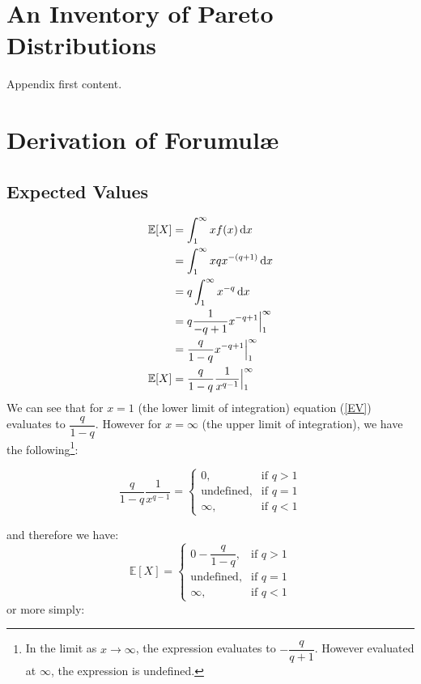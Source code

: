 \newpage
\appendix
\appendixpage

\section{An Inventory of Pareto Distributions}\label{ParetoInventory}
Appendix first content.

\section{Derivation of Forumul\ae}

\subsection{Expected Values}\label{sec:ParetoEV}
\begin{align}
\mathbb{E}[X] & = \int_{1}^{\infty}x f(x) \operatorname{d \!} x \nonumber\\
& = \int_{1}^{\infty}xqx^{-(q+1)} \operatorname{d \!} x\nonumber\\
& = q \int_{1}^{\infty}x^{-q} \operatorname{d \!} x\nonumber\\
& = q \frac{1}{-q+1} x^{-q+1} \Big|_{1}^{\infty}\nonumber\\
& = \frac{q}{1-q} x^{-q+1} \Big|_{1}^{\infty}\nonumber\\
\mathbb{E}[X] 	& = \frac{q}{1-q} \dfrac{1}{x^{q-1}} \Big|_{1}^{\infty}\label{eqn:ParetoEV}
\end{align}
We can see that for $x = 1$ (the lower limit of integration) equation (\ref{EV}) evaluates to $\dfrac{q}{1-q}$. However for $x = \infty$ (the upper limit of integration), we have the following\footnote{In the limit as $x\to\infty$, the expression evaluates to  $-\dfrac{q}{q+1}$. However evaluated at $\infty$, the expression is undefined.}:

\[
\frac{q}{1-q} \dfrac{1}{x^{q-1}} = 
\begin{cases}
0,& \text{if } q > 1\\
\text{undefined},& \text{if }q = 1\\         
\infty, & \text{if }q < 1
\end{cases}
\]

and therefore we have: 
\[
\mathbb{E}[X]  = 
\begin{cases}
0 - \dfrac{q}{1-q},& \text{if } q > 1\\
\text{undefined},& \text{if } q = 1\\         
\infty, & \text{if }q < 1
\end{cases}
\]
or more simply:

